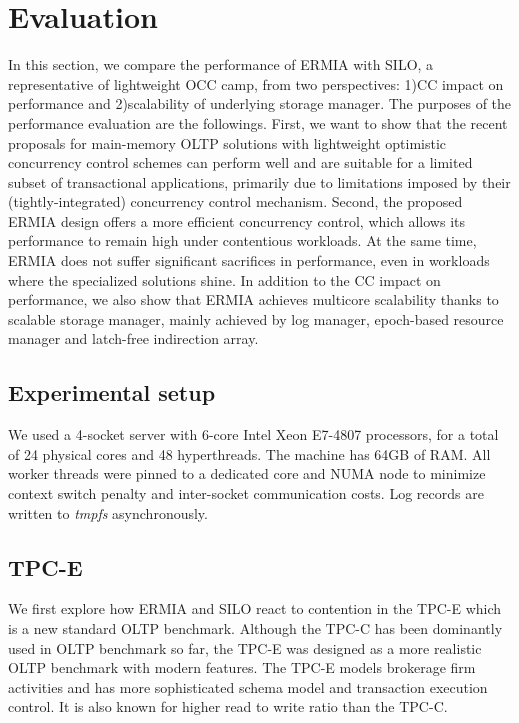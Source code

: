 
\section{Evaluation}
In this section, we compare the performance of ERMIA with SILO, a representative of lightweight OCC camp, from two perspectives: 1)CC impact on performance and 2)scalability of underlying storage manager. 
The purposes of the performance evaluation are the followings. First, we want to show that the recent proposals for main-memory OLTP solutions with lightweight optimistic concurrency control schemes can perform well and are suitable for a limited subset of transactional applications, primarily due to limitations imposed by their (tightly-integrated) concurrency control mechanism. Second, the proposed ERMIA design offers a more efficient concurrency control, which allows its performance to remain high under contentious workloads. At the same time, ERMIA does not suffer significant sacrifices in performance, even in workloads where the specialized solutions shine. In addition to the CC impact on performance, we also show that ERMIA achieves multicore scalability thanks to scalable storage manager, mainly achieved by log manager, epoch-based resource manager and latch-free indirection array. 


\subsection{Experimental setup}
We used a 4-socket server with 6-core Intel Xeon E7-4807 processors, for a total of 24 physical cores and 48 hyperthreads. The machine has 64GB of RAM. All worker threads were pinned to a dedicated core and NUMA node to minimize context switch penalty and inter-socket communication costs. Log records are written to \textit{tmpfs} asynchronously.

\subsection{TPC-E}
We first explore how ERMIA and SILO react to contention in the TPC-E which is a new standard OLTP benchmark. Although the TPC-C has been dominantly used in OLTP benchmark so far, the TPC-E was designed as a more realistic OLTP benchmark with modern features. The TPC-E models brokerage firm activities and has more sophisticated schema model and transaction execution control. It is also known for higher read to write ratio than the TPC-C. 

